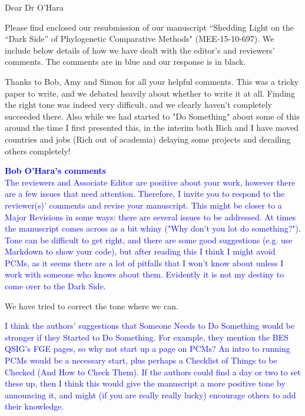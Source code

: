 \documentclass[12pt]{letter}
\begin{document}
\begin{letter}{}
\opening{Dear Dr O'Hara}

Please find enclosed our resubmission of our manuscript ``Shedding Light on the ``Dark Side'' of Phylogenetic Comparative Methods" (MEE-15-10-697). We include below details of how we have dealt with the editor's and reviewers' comments. The comments are in blue and our response is in black.

Thanks to Bob, Amy and Simon for all your helpful comments. This was a tricky paper to write, and we debated heavily about whether to write it at all. Finding the right tone was indeed very difficult, and we clearly haven't completely succeeded there. Also while we had started to "Do Something" about some of this around the time I first presented this, in the interim both Rich and I have moved countries and jobs (Rich out of academia) delaying some projects and derailing others completely!

\textcolor{blue}{\textbf{Bob O'Hara's comments}}\\

\textcolor{blue}{The reviewers and Associate Editor are positive about your work, however there are a few issues that need attention. Therefore, I invite you to respond to the reviewer(s)' comments and revise your manuscript. This might be closer to a Major Revisions in some ways: there are several issues to be addressed. At times the manuscript comes across as a bit whiny ("Why don't you lot do something?"). Tone can be difficult to get right, and there are some good suggestions (e.g. use Markdown to show your code), but after reading this I think I might avoid PCMs, as it seems there are a lot of pitfalls that I won't know about unless I work with someone who knows about them. Evidently it is not my destiny to come over to the Dark Side.}

We have tried to correct the tone where we can. 

\textcolor{blue}{I think the authors' suggestions that Someone Needs to Do Something would be stronger if they Started to Do Something. For example, they mention the BES QSIG's FGE pages, so why not start up a page on PCMs? An intro to running PCMs would be a necessary start, plus perhaps a Checklist of Things to be Checked (And How to Check Them). If the authors could find a day or two to set these up, then I think this would give the manuscript a more positive tone by announcing it, and might (if you are really really lucky) encourage others to add their knowledge.}


\end{letter}
\end{document}
